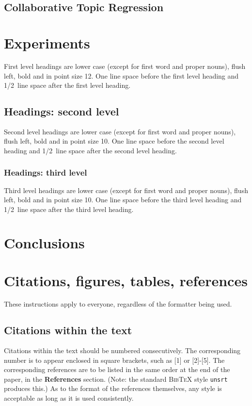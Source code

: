 \documentclass{article} %
\begin{document}
\subsection{Collaborative Topic Regression}


\section{Experiments}
\label{headings}

First level headings are lower case (except for first word and proper nouns),
flush left, bold and in point size 12. One line space before the first level
heading and 1/2~line space after the first level heading.

\subsection{Headings: second level}

Second level headings are lower case (except for first word and proper nouns),
flush left, bold and in point size 10. One line space before the second level
heading and 1/2~line space after the second level heading.

\subsubsection{Headings: third level}

Third level headings are lower case (except for first word and proper nouns),
flush left, bold and in point size 10. One line space before the third level
heading and 1/2~line space after the third level heading.

\section{Conclusions}


\section{Citations, figures, tables, references}
\label{others}

These instructions apply to everyone, regardless of the formatter being used.

\subsection{Citations within the text}

Citations within the text should be numbered consecutively. The corresponding
number is to appear enclosed in square brackets, such as [1] or [2]-[5]. The
corresponding references are to be listed in the same order at the end of the
paper, in the \textbf{References} section. (Note: the standard
\textsc{Bib\TeX} style \texttt{unsrt} produces this.) As to the format of the
references themselves, any style is acceptable as long as it is used
consistently.
\end{document}
